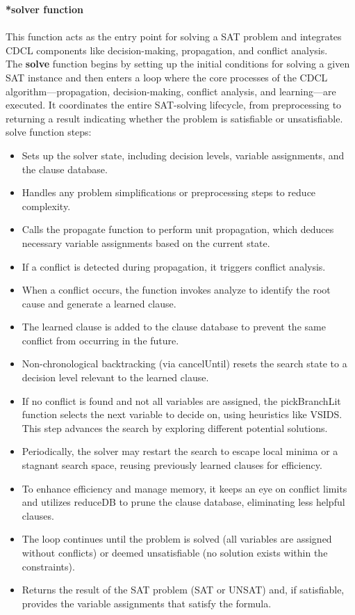 \documentclass[runningheads]{llncs}
\begin{document}
\textbf{*solver function}
\\
\\
This function acts as the entry point for solving a SAT problem and integrates CDCL components like decision-making, propagation, and conflict analysis.\\

The \textbf{solve} function begins by setting up the initial conditions for solving a given SAT instance and then enters a loop where the core processes of the CDCL algorithm—propagation, decision-making, conflict analysis, and learning—are executed. It coordinates the entire SAT-solving lifecycle, from preprocessing to returning a result indicating whether the problem is satisfiable or unsatisfiable.
\\
solve function steps:
\begin{itemize}
  \item Sets up the solver state, including decision levels, variable assignments, and the clause database.
  \item Handles any problem simplifications or preprocessing steps to reduce complexity.
  \item Calls the propagate function to perform unit propagation, which deduces necessary variable assignments based on the current state.
  \item If a conflict is detected during propagation, it triggers conflict analysis.
  \item When a conflict occurs, the function invokes analyze to identify the root cause and generate a learned clause.
   \item The learned clause is added to the clause database to prevent the same conflict from occurring in the future.
   \item Non-chronological backtracking (via cancelUntil) resets the search state to a decision level relevant to the learned clause.
   \item If no conflict is found and not all variables are assigned, the pickBranchLit function selects the next variable to decide on, using heuristics like VSIDS. This step advances the search by exploring different potential solutions.
   \item Periodically, the solver may restart the search to escape local minima or a stagnant search space, reusing previously learned clauses for efficiency.
   \item To enhance efficiency and manage memory, it keeps an eye on conflict limits and utilizes reduceDB to prune the clause database, eliminating less helpful clauses.
   \item The loop continues until the problem is solved (all variables are assigned without conflicts) or deemed unsatisfiable (no solution exists within the constraints).
   \item Returns the result of the SAT problem (SAT or UNSAT) and, if satisfiable, provides the variable assignments that satisfy the formula.
\end{itemize}
\end{document}
